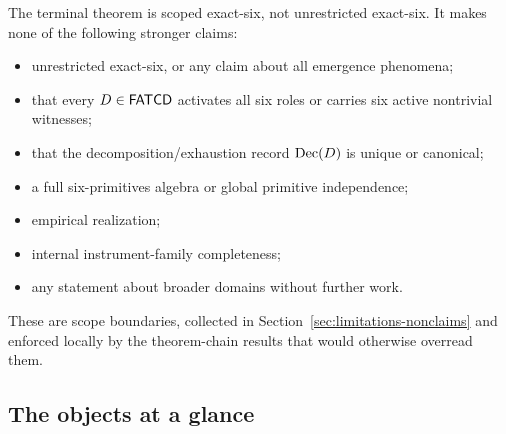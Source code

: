 The terminal theorem is scoped exact-six, not unrestricted exact-six.
It makes none of the following stronger claims:
\begin{itemize}[topsep=2pt,itemsep=1pt]
  \item unrestricted exact-six, or any claim about all emergence
    phenomena;
  \item that every \(D \in \mathsf{FATCD}{}\) activates all six roles or
    carries six active nontrivial witnesses;
  \item that the decomposition/exhaustion record \(\operatorname{Dec}\!\left(D\right)\) is unique
    or canonical;
  \item a full six-primitives algebra or global primitive
    independence;
  \item empirical realization;
  \item internal instrument-family completeness;
  \item any statement about broader domains without further work.
\end{itemize}
These are scope boundaries, collected in
Section~\ref{sec:limitations-nonclaims} and enforced locally by the
theorem-chain results that would otherwise overread them.

\subsection{The objects at a glance}\label{subsec:objects-at-a-glance}

